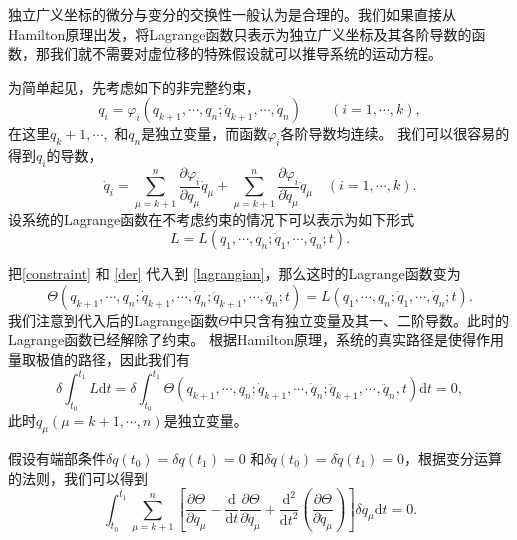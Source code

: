 \documentclass[a4paper,UTF8,11pt,hyperref]{ctexart}
\newcommand{\mathd}{\mathrm{d}}
\begin{document}
独立广义坐标的微分与变分的交换性一般认为是合理的。我们如果直接从Hamilton原理出发，将Lagrange函数只表示为独立广义坐标及其各阶导数的函数，那我们就不需要对虚位移的特殊假设就可以推导系统的运动方程。

为简单起见，先考虑如下的非完整约束，
\begin{equation}
  q_i = \varphi_i  ( q_{k + 1}, \cdots, q_n ; \dot{q}_{k + 1}, \cdots,
  \dot{q}_n) \hspace{2em} ( i = 1, \cdots, k), \label{constraint}
\end{equation}
在这里$q_k+1,\cdots,$ 和$q_n$是独立变量，而函数$\varphi_i $各阶导数均连续。
我们可以很容易的得到$q_i$的导数，
\begin{equation}
  \dot{q}_i = \sum^n_{\mu = k + 1} \frac{\partial \varphi_i}{\partial q_{\mu}}
  \dot{q}_{\mu}  + \sum^n_{\mu = k + 1} \frac{\partial
  \varphi_i}{\partial \dot{q}_{\mu}} \ddot{q}_{\mu} \hspace{1em} ( i = 1,
  \cdots, k) . \label{der}
\end{equation}
设系统的Lagrange函数在不考虑约束的情况下可以表示为如下形式
\begin{equation}
  L = L ( q_1, \cdots, q_n ; \dot{q}_1, \cdots, \dot{q}_n ; t) .
  \label{lagrangian}
\end{equation}

把\eqref{constraint} 和 \eqref{der} 代入到 \eqref{lagrangian}，那么这时的Lagrange函数变为
\[ \Theta ( q_{k + 1}, \cdots, q_n ; \dot{q}_{k + 1}, \cdots, \dot{q}_n ;
   \ddot{q}_{k +1}, \cdots, \ddot{q}_n ; t) = L ( q_1, \cdots, q_n ;
   \dot{q}_1, \cdots, \dot{q}_n ; t) . \]
我们注意到代入后的Lagrange函数$\Theta$中只含有独立变量及其一、二阶导数。此时的Lagrange函数已经解除了约束。
根据Hamilton原理，系统的真实路径是使得作用量取极值的路径，因此我们有
\begin{equation}
\delta \int_{t_0}^{t_1} L \mathd t = \delta \int_{t_0}^{t_1} \Theta ( q_{k
   + 1}, \cdots, q_n ; \dot{q}_{k + 1}, \cdots, \dot{q}_n ; \ddot{q}_{k + 1},
   \cdots_{}, \ddot{q}_n, t) \mathd t = 0,
\end{equation}
此时$q_\mu(\mu=k+1,\cdots,n)$是独立变量。

假设有端部条件$\delta q ( t_0) = \delta q ( t_1) = 0$ 和$\delta
\dot{q} ( t_0) = \delta \dot{q} ( t_1) = 0$，根据变分运算的法则，我们可以得到
\begin{equation}
 \int_{t_0}^{t_1}  \sum_{\mu = k + 1}^n \left[ \frac{\partial
   \Theta}{\partial q_{\mu}} - \frac{\mathd}{\mathd t} \frac{\partial
   \Theta}{\partial \dot{q}_{\mu}} + \frac{\mathd^2}{\mathd t^2} \left(
   \frac{\partial \Theta}{\partial \ddot{q}_{\mu}} \right) \right] \delta
   q_{\mu} \mathd t = 0.
\end{equation}
\end{document}
